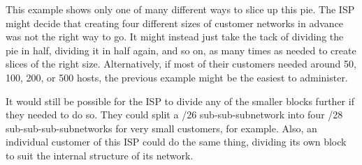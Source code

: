 This example shows only one of many different ways to slice up this pie.
The ISP might decide that creating four different sizes of customer
networks in advance was not the right way to go. It might instead just
take the tack of dividing the pie in half, dividing it in half again,
and so on, as many times as needed to create slices of the right size.
Alternatively, if most of their customers needed around 50, 100, 200, or
500 hosts, the previous example might be the easiest to administer.

It would still be possible for the ISP to divide any of the smaller
blocks further if they needed to do so. They could split a /26
sub-sub-subnetwork into four /28 sub-sub-sub-subnetworks for very small
customers, for example. Also, an individual customer of this ISP could
do the same thing, dividing its own block to suit the internal structure
of its network.


